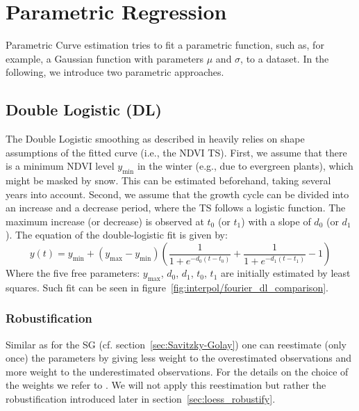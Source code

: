 
\section{Parametric Regression} 
	\label{sec:itpl_parametric}
	Parametric Curve estimation tries to fit a parametric function, such as, for example, a Gaussian function with parameters $\mu$ and $\sigma$, to a dataset. In the following, we introduce two parametric approaches.

	\subsection{Double Logistic (DL)}
		\label{sec:double_logistic}
		The Double Logistic smoothing as described in \cite{beckImprovedMonitoringVegetation2006} heavily relies on shape assumptions of the fitted curve (i.e., the NDVI {TS}). First, we assume that there  is a minimum NDVI level $y_{\min}$ in the winter (e.g., due to evergreen plants), which might be masked by snow. This can be estimated beforehand, taking several years into account. Second, we assume that the growth cycle can be divided into an increase and a decrease period, where the {TS} follows a logistic function. The maximum increase (or decrease) is observed at $t_0$ (or $t_1$) with a slope of $d_0$ (or $d_1$). The equation of the double-logistic fit is given by:
		\begin{equation*}
			y(t) = y_{\min} + \left(y_{\max}-y_{\min}\right)\left(\frac{1}{1+e^{-d_0(t-t_0)}}+\frac{1}{1+e^{-d_1(t-t_1)}}-1\right)
		\end{equation*}
		Where the five free parameters: $y_{\max}$, $d_0$, $d_1$, $t_0$, $t_1$ are initially estimated by least squares. Such fit can be seen in figure~\ref{fig:interpol/fourier_dl_comparison}.

		\subsubsection*{Robustification}
		Similar as for the SG (cf. section~\ref{sec:Savitzky-Golay}) one can reestimate (only once) the parameters by giving less weight to the overestimated observations and more weight to the underestimated observations. For the details on the choice of the weights we refer to \cite{beckImprovedMonitoringVegetation2006}. We will not apply this reestimation but rather the robustification introduced later in section~\ref{sec:loess_robustify}.

